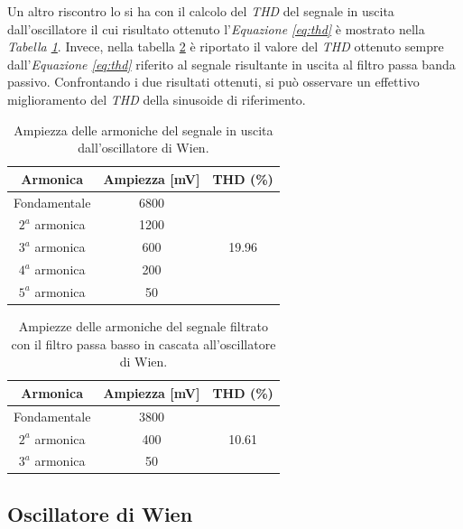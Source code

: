 \documentclass[titlepage]{report}
\begin{document}
	Un altro riscontro lo si ha con il calcolo del \textit{THD} del segnale in uscita dall'oscillatore il cui risultato ottenuto l'\textit{Equazione \ref{eq:thd}} è mostrato nella \textit{Tabella \ref{tab:THD_WIEN}}. Invece, nella tabella \ref{tab:THD_WIEN+LP} è riportato il valore del \textit{THD} ottenuto sempre dall'\textit{Equazione \ref{eq:thd}} riferito al segnale risultante in uscita al filtro passa banda passivo. 
	Confrontando i due risultati ottenuti, si può osservare un effettivo miglioramento del \textit{THD} della sinusoide di riferimento.

	\begin{table}[h!]
		\centering
		\begin{tabular}{||c|c|c||}
			\hline
			\cellcolor{gray!10}Armonica & \cellcolor{gray!10}Ampiezza [mV] & \cellcolor{gray!10}THD (\%) \\
			\hline
			Fondamentale & 6800 &\\
			\cline{1-2}
			$2^a$ armonica & 1200 & \\
			\cline{1-2} 
			$3^a$ armonica & 600 & 19.96 \\
			\cline{1-2} 
			$4^a$ armonica & 200 & \\
			\cline{1-2} 
			$5^a$ armonica & 50 & \\
			\hline	
		\end{tabular}
		\caption{Ampiezza delle armoniche del segnale in uscita dall'oscillatore di Wien.}
		\label{tab:THD_WIEN}
	\end{table}

	\begin{table}[h!]
		\centering
		\begin{tabular}{||c|c|c||}
			\hline
			\cellcolor{gray!10}Armonica & \cellcolor{gray!10}Ampiezza [mV] & \cellcolor{gray!10}THD (\%) \\
			\hline
			Fondamentale & 3800 &\\
			\cline{1-2}
			$2^a$ armonica & 400 & 10.61 \\
			\cline{1-2} 
			$3^a$ armonica & 50 & \\
			\hline	
		\end{tabular}
		\caption{Ampiezze delle armoniche del segnale filtrato con il filtro passa basso in cascata all'oscillatore di Wien.}
		\label{tab:THD_WIEN+LP}
	\end{table}

	\subsection{Oscillatore di Wien}
	\label{subsc: wien giusto}
\end{document}
